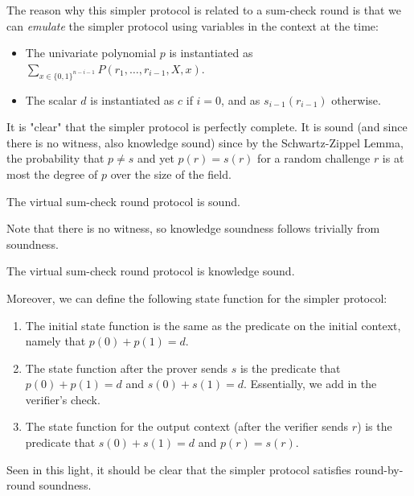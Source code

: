 The reason why this simpler protocol is related to a sum-check round is that we can \emph{emulate} the simpler protocol using variables in the context at the time:
\begin{itemize}
    \item The univariate polynomial $p$ is instantiated as $\sum_{x \in \{0, 1\}^{n - i - 1}} P(r_1, \ldots, r_{i - 1}, X, x)$.
    \item The scalar $d$ is instantiated as $c$ if $i = 0$, and as $s_{i - 1}(r_{i - 1})$ otherwise.
\end{itemize}

It is "clear" that the simpler protocol is perfectly complete. It is sound (and since there is no
witness, also knowledge sound) since by the Schwartz-Zippel Lemma, the probability that $p \ne s$
and yet $p(r) = s(r)$ for a random challenge $r$ is at most the degree of $p$ over the size of the
field.

\begin{theorem}
    The virtual sum-check round protocol is sound.
    \label{thm:virtual_sumcheck_round_protocol_sound}
\end{theorem}

Note that there is no witness, so knowledge soundness follows trivially from soundness. 

\begin{theorem}
    The virtual sum-check round protocol is knowledge sound.
    \label{thm:virtual_sumcheck_round_protocol_knowledge_sound}
\end{theorem}

Moreover, we
can define the following state function for the simpler protocol:
\begin{enumerate}
    \item The initial state function is the same as the predicate on the initial context, namely that
    $p(0) + p(1) = d$.
    \item The state function after the prover sends $s$ is the predicate that $p(0) + p(1) = d$ and
    $s(0) + s(1) = d$. Essentially, we add in the verifier's check.
    \item The state function for the output context (after the verifier sends $r$) is the predicate that $s(0) + s(1) = d$ and $p(r) = s(r)$.
\end{enumerate}
Seen in this light, it should be clear that the simpler protocol satisfies round-by-round soundness.

